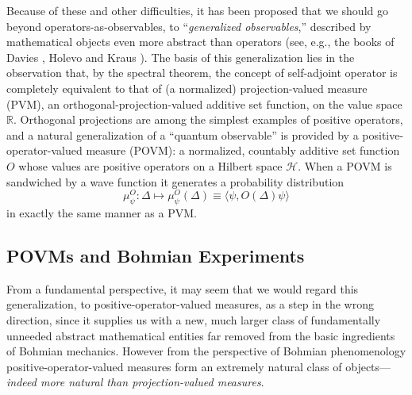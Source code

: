 \documentclass[12pt]{article}
\newcommand{\BM}{Bohmian mechanics}
\newcommand{\wf}{wave function}
\renewcommand{\H}{\mbox{$\mathcal{H}$}}
\newcommand{\R}{\mathbb{R}}
\begin{document}
Because of these and other difficulties, it has been proposed that we
should go beyond operators-as-observables, to ``{\it generalized
   observables\/},'' described by mathematical objects even more
abstract than operators (see, e.g., the books of Davies \cite{Dav76},
Holevo \cite{Hol82} and Kraus \cite{Kra83}).  The basis of this
generalization lies in the observation that, by the spectral theorem,
the concept of self-adjoint operator is completely equivalent to that
of (a normalized) projection-valued measure (PVM), an
orthogonal-projection-valued additive set function, on the value space
$\R$.  Orthogonal projections are among the simplest examples of
positive operators, and a natural generalization of a ``quantum
observable'' is provided by a positive-operator-valued measure (POVM):
a normalized, countably additive set function $O$ whose values are
positive operators on a Hilbert space \H{}.  When a POVM is sandwiched
by a \wf{} it generates a probability distribution
%
\begin{equation}
\mu^O_\psi: \Delta\mapsto \mu^O_\psi (\Delta) \equiv \langle\psi ,
O(\Delta)\psi\rangle
\label{mupsipov}
\end{equation}
%
in exactly the same manner as a PVM.

\subsection{POVMs and Bohmian Experiments}
\label{secpovbe}
{}From a fundamental perspective, it may seem that we would regard
this generalization, to positive-operator-valued measures, as a step
in the wrong direction, since it supplies us with a new, much larger
class of fundamentally unneeded abstract mathematical entities far
removed {}{}from the basic ingredients of \BM{}.  However {}{}from the
perspective of Bohmian phenomenology positive-operator-valued measures
form an extremely natural class of objects---\emph{indeed more natural
   than projection-valued measures}.
\end{document}
